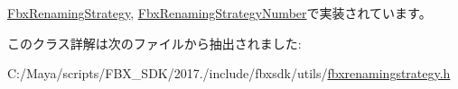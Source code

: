 \hyperlink{class_fbx_renaming_strategy_af21a13396dd6726e87b123f398ac79f2}{Fbx\+Renaming\+Strategy}, \hyperlink{class_fbx_renaming_strategy_number_ae619f9e95e3fcb215a12728dfb739659}{Fbx\+Renaming\+Strategy\+Number}で実装されています。



このクラス詳解は次のファイルから抽出されました\+:\begin{DoxyCompactItemize}
\item 
C\+:/\+Maya/scripts/\+F\+B\+X\+\_\+\+S\+D\+K/2017./include/fbxsdk/utils/\hyperlink{fbxrenamingstrategy_8h}{fbxrenamingstrategy.\+h}\end{DoxyCompactItemize}

